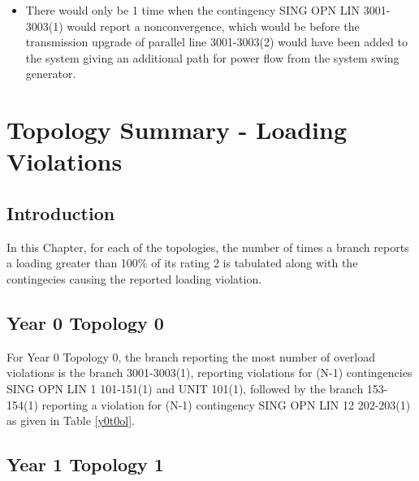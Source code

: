 \documentclass[10pt]{report}
\begin{document}
\begin{itemize}
\item There would only be 1 time when the contingency SING OPN LIN 3001-3003(1) would report a nonconvergence, which would be before the transmission upgrade of parallel line 3001-3003(2) would have been added to the system giving an additional path for power flow from the system swing generator.

\end{itemize} 


\chapter{Topology Summary - Loading Violations}
\label{chap:ovrld}

\section{Introduction}

In this Chapter, for each of the topologies, the number of times a branch reports a loading greater than 100\% of its rating 2 is tabulated along with the contingecies causing the reported loading violation.

\section{Year 0 Topology 0}

For Year 0 Topology 0, the branch reporting the most number of overload violations is the branch 3001-3003(1), reporting violations for (N-1) contingencies SING OPN LIN   1 101-151(1) and UNIT 101(1), followed by the branch 153-154(1) reporting a violation for (N-1) contingency SING OPN LIN   12 202-203(1) as given in Table \ref{y0t0ol}.


\begin{table}[H]
\caption{Branch overload violation count with contingencies - Year 0, Topology 0}
\label{y0t0ol}

\centering
{}
\end{table}


\section{Year 1 Topology 1}
\end{document}
